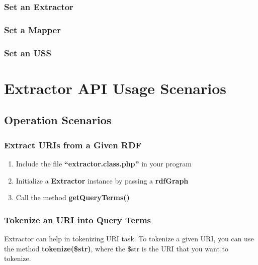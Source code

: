 \documentclass[letterpaper,10pt,english]{sphinxmanual}
\begin{document}
\subsubsection{Set an Extractor}
\label{docs/scenarios/x2r:set-an-extractor}

\subsubsection{Set a Mapper}
\label{docs/scenarios/x2r:set-a-mapper}

\subsubsection{Set an USS}
\label{docs/scenarios/x2r:set-an-uss}

\section{Extractor API Usage Scenarios}
\label{docs/scenarios/extractor:extractor-api-usage-scenarios}\label{docs/scenarios/extractor::doc}

\subsection{Operation Scenarios}
\label{docs/scenarios/extractor:operation-scenarios}

\subsubsection{Extract URIs from a Given RDF}
\label{docs/scenarios/extractor:extract-uris-from-a-given-rdf}\begin{enumerate}
\item {} 
Include the file \textbf{``extractor.class.php''} in your program

\item {} 
Initialize a \textbf{Extractor} instance by passing a \textbf{rdfGraph}

\item {} 
Call the method \textbf{getQueryTerms()}

\end{enumerate}


\subsubsection{Tokenize an URI into Query Terms}
\label{docs/scenarios/extractor:tokenize-an-uri-into-query-terms}
Extractor can help in tokenizing URI task. To tokenize a given URI, you can use the method \textbf{tokenize(\$str)}, where the \$str is the URI that you want to tokenize.
\end{document}
